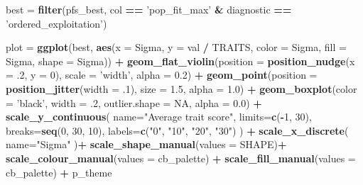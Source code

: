 \documentclass[]{book}
\newenvironment{Shaded}{\begin{snugshade}}{\end{snugshade}}
\newcommand{\DataTypeTok}[1]{\textcolor[rgb]{0.13,0.29,0.53}{#1}}
\newcommand{\DecValTok}[1]{\textcolor[rgb]{0.00,0.00,0.81}{#1}}
\newcommand{\FloatTok}[1]{\textcolor[rgb]{0.00,0.00,0.81}{#1}}
\newcommand{\KeywordTok}[1]{\textcolor[rgb]{0.13,0.29,0.53}{\textbf{#1}}}
\newcommand{\NormalTok}[1]{#1}
\newcommand{\OperatorTok}[1]{\textcolor[rgb]{0.81,0.36,0.00}{\textbf{#1}}}
\newcommand{\OtherTok}[1]{\textcolor[rgb]{0.56,0.35,0.01}{#1}}
\newcommand{\StringTok}[1]{\textcolor[rgb]{0.31,0.60,0.02}{#1}}
\begin{document}
\begin{Shaded}
\begin{Highlighting}[]
\NormalTok{best =}\StringTok{ }\KeywordTok{filter}\NormalTok{(pfs_best, col }\OperatorTok{==}\StringTok{ 'pop_fit_max'} \OperatorTok{&}\StringTok{ }\NormalTok{diagnostic }\OperatorTok{==}\StringTok{ 'ordered_exploitation'}\NormalTok{)}

\NormalTok{plot =}\StringTok{ }\KeywordTok{ggplot}\NormalTok{(best, }\KeywordTok{aes}\NormalTok{(}\DataTypeTok{x =}\NormalTok{ Sigma, }\DataTypeTok{y =}\NormalTok{ val }\OperatorTok{/}\StringTok{ }\NormalTok{TRAITS, }\DataTypeTok{color =}\NormalTok{ Sigma, }\DataTypeTok{fill =}\NormalTok{ Sigma, }\DataTypeTok{shape =}\NormalTok{ Sigma)) }\OperatorTok{+}
\StringTok{  }\KeywordTok{geom_flat_violin}\NormalTok{(}\DataTypeTok{position =} \KeywordTok{position_nudge}\NormalTok{(}\DataTypeTok{x =} \FloatTok{.2}\NormalTok{, }\DataTypeTok{y =} \DecValTok{0}\NormalTok{), }\DataTypeTok{scale =} \StringTok{'width'}\NormalTok{, }\DataTypeTok{alpha =} \FloatTok{0.2}\NormalTok{) }\OperatorTok{+}
\StringTok{  }\KeywordTok{geom_point}\NormalTok{(}\DataTypeTok{position =} \KeywordTok{position_jitter}\NormalTok{(}\DataTypeTok{width =} \FloatTok{.1}\NormalTok{), }\DataTypeTok{size =} \FloatTok{1.5}\NormalTok{, }\DataTypeTok{alpha =} \FloatTok{1.0}\NormalTok{) }\OperatorTok{+}
\StringTok{  }\KeywordTok{geom_boxplot}\NormalTok{(}\DataTypeTok{color =} \StringTok{'black'}\NormalTok{, }\DataTypeTok{width =} \FloatTok{.2}\NormalTok{, }\DataTypeTok{outlier.shape =} \OtherTok{NA}\NormalTok{, }\DataTypeTok{alpha =} \FloatTok{0.0}\NormalTok{) }\OperatorTok{+}
\StringTok{  }\KeywordTok{scale_y_continuous}\NormalTok{(}
    \DataTypeTok{name=}\StringTok{"Average trait score"}\NormalTok{,}
    \DataTypeTok{limits=}\KeywordTok{c}\NormalTok{(}\OperatorTok{-}\DecValTok{1}\NormalTok{, }\DecValTok{30}\NormalTok{),}
    \DataTypeTok{breaks=}\KeywordTok{seq}\NormalTok{(}\DecValTok{0}\NormalTok{, }\DecValTok{30}\NormalTok{, }\DecValTok{10}\NormalTok{),}
    \DataTypeTok{labels=}\KeywordTok{c}\NormalTok{(}\StringTok{"0"}\NormalTok{, }\StringTok{"10"}\NormalTok{, }\StringTok{"20"}\NormalTok{, }\StringTok{"30"}\NormalTok{)}
\NormalTok{  ) }\OperatorTok{+}
\StringTok{  }\KeywordTok{scale_x_discrete}\NormalTok{(}
    \DataTypeTok{name=}\StringTok{"Sigma"}
\NormalTok{  )}\OperatorTok{+}
\StringTok{  }\KeywordTok{scale_shape_manual}\NormalTok{(}\DataTypeTok{values =}\NormalTok{ SHAPE)}\OperatorTok{+}
\StringTok{  }\KeywordTok{scale_colour_manual}\NormalTok{(}\DataTypeTok{values =}\NormalTok{ cb_palette) }\OperatorTok{+}
\StringTok{  }\KeywordTok{scale_fill_manual}\NormalTok{(}\DataTypeTok{values =}\NormalTok{ cb_palette) }\OperatorTok{+}
\StringTok{  }\NormalTok{p_theme}


\end{Highlighting}
\end{Shaded}
\end{document}
